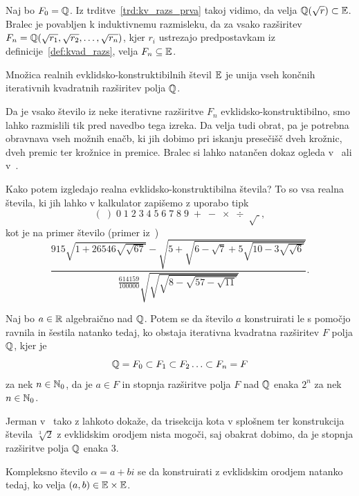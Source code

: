 Naj bo $F_0 = \mathbb Q$. Iz trditve~\ref{trd:kv_razs_prva} takoj vidimo, da velja $\mathbb Q(\sqrt{r}) \subset \mathbb E$. Bralec je povabljen k induktivnemu razmisleku, da za vsako razširitev $ F_n = \mathbb Q(\sqrt{r_1}, \sqrt{r_2}, \ldots, \sqrt{r_n})$, kjer $r_i$ ustrezajo predpostavkam iz definicije~\ref{def:kvad_razs}, velja $F_n \subseteq \mathbb E$.

\begin{izrek}
    Množica realnih evklidsko-konstruktibilnih števil $\mathbb E$ je unija vseh končnih iterativnih kvadratnih razširitev polja $\mathbb Q$.
\end{izrek}

Da je vsako število iz neke iterativne razširitve $F_n$ evklidsko-konstruktibilno, smo lahko razmislili tik pred navedbo tega izreka. Da velja tudi obrat, pa je potrebna obravnava vseh možnih enačb, ki jih dobimo pri iskanju presečišč dveh krožnic, dveh premic ter krožnice in premice. Bralec si lahko natančen dokaz ogleda v~\cite[str.\ 38--39]{geometricconstructions} ali v~\cite{jerman1998}.

Kako potem izgledajo realna evklidsko-konstruktibilna števila? To so vsa realna števila, ki jih lahko v kalkulator zapišemo z uporabo tipk
$$ (\;)\;0\;1\;2\;3\;4\;5\;6\;7\;8\;9\;+\;-\;\times\;\div\;\sqrt{\;},$$
kot je na primer število (primer iz~\cite[str.\ 37]{geometricconstructions})
$$ \frac{
    915 \sqrt{1 + 26546 \sqrt{\sqrt{67}}} -
    \sqrt{5 + \sqrt{6 - \sqrt{7} + 5\sqrt{10 - 3\sqrt{\sqrt{6}}}}}
}{
    \frac{614159}{100000} \sqrt{\sqrt{\sqrt{8 - \sqrt{57 - \sqrt{11}}}}}
}.
$$

\begin{izrek}
    \label{izr:evkl_konstr}
    Naj bo $a \in \mathbb R$ algebraično nad $\mathbb Q$. Potem se da število $a$ konstruirati le s pomočjo ravnila in šestila natanko tedaj, ko obstaja iterativna kvadratna razširitev $F$ polja $\mathbb Q$, kjer je
    $$ \mathbb Q = F_0 \subset F_1 \subset F_2 \ldots \subset F_n = F$$
    za nek $n \in \mathbb N_0$, da je $a \in F$ in stopnja razširitve polja $F$ nad $\mathbb Q$ enaka $2^n$ za nek $n \in \mathbb N_0$.
\end{izrek}

Jerman v~\cite[str.\ 77--78]{jerman1998} tako z lahkoto dokaže, da trisekcija kota v splošnem ter konstrukcija števila $ \sqrt[3]{2} $ z evklidskim orodjem nista mogoči, saj obakrat dobimo, da je stopnja razširitve polja $\mathbb Q$ enaka $3$.

\begin{posledica}
    Kompleksno število $\alpha = a + bi$ se da konstruirati z evklidskim orodjem natanko tedaj, ko velja $(a, b) \in \mathbb E \times \mathbb E$.
\end{posledica}

